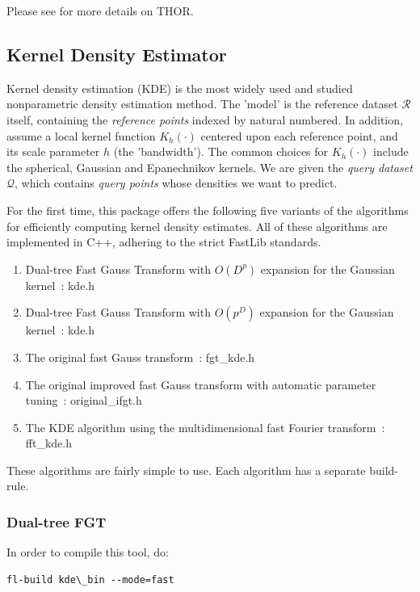 \documentclass[letter]{report}
\begin{document}
Please see \cite{boyer2007tho} for more details on THOR.

\subsection{Kernel Density Estimator}
Kernel density estimation (KDE) is the most widely used and studied nonparametric density estimation method. The 'model' is the reference dataset $\mathcal{R}$ itself, containing the {\it reference points}
indexed by natural numbered. In addition, assume a local kernel function $K_h(\cdot)$ centered upon each reference point, and its scale parameter $h$ (the 'bandwidth'). The common choices for $K_h(\cdot)$ include the spherical, Gaussian and Epanechnikov kernels. We are given the {\it query dataset} $\mathcal{Q}$, which contains {\it query points} whose densities we want to predict.

For the first time, this package offers the following five variants of
the algorithms for efficiently computing kernel density estimates. All
of these algorithms are implemented in C++, adhering to the strict
FastLib standards.

\begin{enumerate}
\item{Dual-tree Fast Gauss Transform with $O(D^p)$ expansion for the
Gaussian kernel~\cite{LEE06}: kde.h}
\item{Dual-tree Fast Gauss Transform with $O(p^D)$ expansion for the
Gaussian kernel~\cite{LEE05}: kde.h}
\item{The original fast Gauss transform~\cite{ggstrain}: fgt\_kde.h}
\item{The original improved fast Gauss transform with automatic
parameter tuning~\cite{YANG03}: original\_ifgt.h}
\item{The KDE algorithm using the multidimensional fast Fourier
transform~\cite{wand94}: fft\_kde.h}
\end{enumerate}

These algorithms are fairly simple to use. Each algorithm has a
separate build-rule.
\subsubsection{Dual-tree FGT}
In order to compile this tool, do: 
\begin{verbatim}
fl-build kde\_bin --mode=fast
\end{verbatim}
\end{document}
